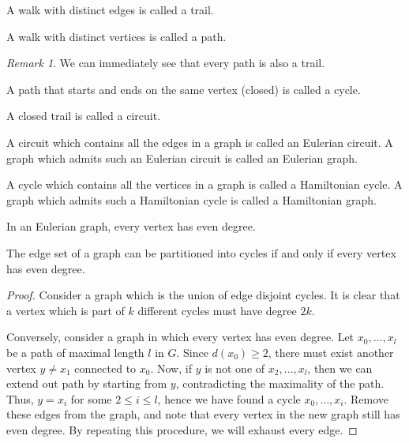 \documentclass[11pt]{article}
\theoremstyle{definition}
\theoremstyle{remark}
\newtheorem*{remark}{Remark}
\numberwithin{equation}{section}
\begin{document}
    \begin{definition}
        A walk with distinct edges is called a trail.
    \end{definition}

    \begin{definition}
        A walk with distinct vertices is called a path.
        \begin{remark}
            We can immediately see that every path is also a trail.
        \end{remark}
    \end{definition}

    \begin{definition}
        A path that starts and ends on the same vertex (closed) is called a cycle.
    \end{definition}

    \begin{definition}
        A closed trail is called a circuit.
    \end{definition}

    \begin{definition}
        A circuit which contains all the edges in a graph is called an Eulerian
        circuit. A graph which admits such an Eulerian circuit is called an Eulerian
        graph.
    \end{definition}

    \begin{definition}
        A cycle which contains all the vertices in a graph is called a Hamiltonian
        cycle. A graph which admits such a Hamiltonian cycle is called a Hamiltonian
        graph.
    \end{definition}

    \begin{lemma}
        In an Eulerian graph, every vertex has even degree.
    \end{lemma}

    \begin{theorem}
        The edge set of a graph can be partitioned into cycles if and only if every
        vertex has even degree.
    \end{theorem}
    \begin{proof}
        Consider a graph which is the union of edge disjoint cycles. It is clear that
        a vertex which is part of $k$ different cycles must have degree $2k$.

        Conversely, consider a graph in which every vertex has even degree. Let $x_0,
        \dots, x_l$ be a path of maximal length $l$ in $G$. Since $d(x_0) \geq 2$,
        there must exist another vertex $y \neq x_1$ connected to $x_0$. Now, if $y$
        is not one of $x_2, \dots, x_l$, then we can extend out path by starting from
        $y$, contradicting the maximality of the path. Thus, $y = x_i$ for some $2
        \leq i \leq l$, hence we have found a cycle $x_0, \dots, x_i$. Remove these
        edges from the graph, and note that every vertex in the new graph still has
        even degree. By repeating this procedure, we will exhaust every edge.
    \end{proof}
\end{document}
